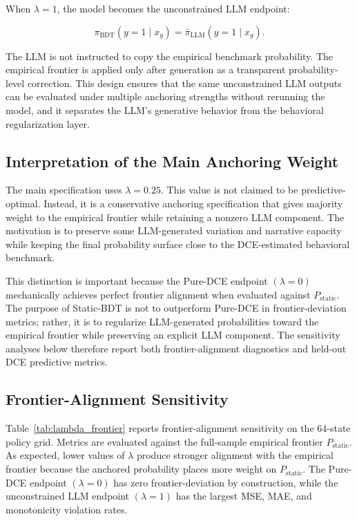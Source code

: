 \documentclass[11pt]{article}
\begin{document}
When \(\lambda=1\), the model becomes the unconstrained LLM endpoint:

\[
\pi_{\mathrm{BDT}}(y=1 \mid x_g)
=
\bar{\pi}_{\mathrm{LLM}}(y=1 \mid x_g).
\]

The LLM is not instructed to copy the empirical benchmark probability. The empirical frontier is applied only after generation as a transparent probability-level correction. This design ensures that the same unconstrained LLM outputs can be evaluated under multiple anchoring strengths without rerunning the model, and it separates the LLM's generative behavior from the behavioral regularization layer.

\subsection{Interpretation of the Main Anchoring Weight}

The main specification uses \(\lambda=0.25\). This value is not claimed to be predictive-optimal. Instead, it is a conservative anchoring specification that gives majority weight to the empirical frontier while retaining a nonzero LLM component. The motivation is to preserve some LLM-generated variation and narrative capacity while keeping the final probability surface close to the DCE-estimated behavioral benchmark.

This distinction is important because the Pure-DCE endpoint \((\lambda=0)\) mechanically achieves perfect frontier alignment when evaluated against \(P_{\mathrm{static}}\). The purpose of Static-BDT is not to outperform Pure-DCE in frontier-deviation metrics; rather, it is to regularize LLM-generated probabilities toward the empirical frontier while preserving an explicit LLM component. The sensitivity analyses below therefore report both frontier-alignment diagnostics and held-out DCE predictive metrics.

\subsection{Frontier-Alignment Sensitivity}

Table~\ref{tab:lambda_frontier} reports frontier-alignment sensitivity on the 64-state policy grid. Metrics are evaluated against the full-sample empirical frontier \(P_{\mathrm{static}}\). As expected, lower values of \(\lambda\) produce stronger alignment with the empirical frontier because the anchored probability places more weight on \(P_{\mathrm{static}}\). The Pure-DCE endpoint \((\lambda=0)\) has zero frontier-deviation by construction, while the unconstrained LLM endpoint \((\lambda=1)\) has the largest MSE, MAE, and monotonicity violation rates.
\end{document}
